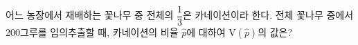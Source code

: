 어느 농장에서 재배하는 꽃나무 중 전체의 $\dfrac{1}{3}$은 카네이션이라 한다. 전체 꽃나무 중에서 200그루를 임의추출할 때, 카네이션의 비율 $\hat{p}$에 대하여 $\mathrm{V}(\hat{p})$의 값은?
